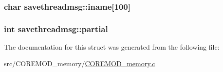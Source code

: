 \subsubsection[{iname}]{\setlength{\rightskip}{0pt plus 5cm}char savethreadmsg\+::iname\mbox{[}100\mbox{]}}\label{structsavethreadmsg_acd2174c7310a13ba8b782fe91b6bc3ab}
\hypertarget{structsavethreadmsg_a67b95feb0e172459de37d4e23fab693b}{}
\subsubsection[{partial}]{\setlength{\rightskip}{0pt plus 5cm}int savethreadmsg\+::partial}\label{structsavethreadmsg_a67b95feb0e172459de37d4e23fab693b}


The documentation for this struct was generated from the following file\+:\begin{DoxyCompactItemize}
\item 
src/\+C\+O\+R\+E\+M\+O\+D\+\_\+memory/\hyperlink{COREMOD__memory_8c}{C\+O\+R\+E\+M\+O\+D\+\_\+memory.\+c}\end{DoxyCompactItemize}

